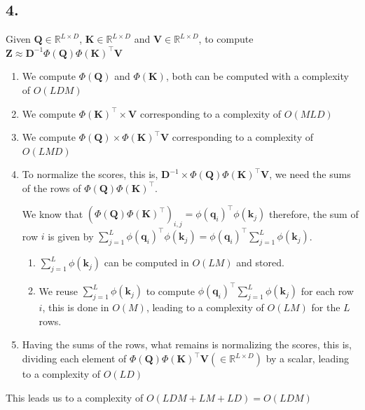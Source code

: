 \documentclass[11pt]{article}
\begin{document}
\subsection{4.}
Given $\bm{Q} \in \mathbb{R}^{L \times D}$, $\bm{K} \in \mathbb{R}^{L \times D}$ and $\bm{V} \in \mathbb{R}^{L \times D}$, to compute $\bm{Z} \approx \bm{D}^{-1} \Phi \left( \bm{Q} \right) \Phi \left( \bm{K} \right)^{\top} \bm{V}$
\begin{enumerate}
\item We compute $\Phi \left( \bm{Q} \right)$ and $\Phi \left( \bm{K} \right)$, both can be computed with a complexity of $O \left( L D M\right)$
\item We compute $\Phi \left( \bm{K} \right)^{\top} \times \bm{V}$ corresponding to a complexity of $O \left(M L D \right)$
\item We compute $\Phi \left( \bm{Q} \right) \times \Phi \left( \bm{K} \right)^{\top} \bm{V}$ corresponding to a complexity of $O \left( L M D \right)$
\item To normalize the scores, this is, $\bm{D}^{-1} \times \Phi \left( \bm{Q} \right) \Phi \left( \bm{K} \right)^{\top} \bm{V}$, we need the sums of the rows of $\Phi \left( \bm{Q} \right) \Phi \left( \bm{K} \right)^{\top}$.

  We know that $\left( \Phi \left( \bm{Q} \right) \Phi \left( \bm{K} \right)^{\top} \right)_{i, j} = \phi \left( \bm{q}_{i} \right)^{\top} \phi \left( \bm{k}_{j} \right)$ therefore, the sum of row $i$ is given by $\sum_{j = 1}^{L} \phi \left( \bm{q}_{i} \right)^{\top} \phi \left( \bm{k}_{j} \right) = \phi \left( \bm{q}_{i} \right)^{\top} \sum_{j = 1}^{L} \phi \left( \bm{k}_{j} \right)$.
  \begin{enumerate}
  \item $\sum_{j = 1}^{L} \phi \left( \bm{k}_{j} \right)$ can be computed in $O \left( L M \right)$ and stored.
  \item We reuse $\sum_{j = 1}^{L} \phi \left( \bm{k}_{j} \right)$ to compute $\phi \left( \bm{q}_{i} \right)^{\top} \sum_{j = 1}^{L} \phi \left( \bm{k}_{j} \right)$ for each row $i$, this is done in $O \left( M \right)$, leading to a complexity of $O \left( L M \right)$ for the $L$ rows.
  \end{enumerate}
\item Having the sums of the rows, what remains is normalizing the scores, this is, dividing each element of $\Phi \left( \bm{Q} \right) \Phi \left( \bm{K} \right)^{\top} \bm{V} \left( \in \mathbb{R}^{L \times D} \right)$ by a scalar, leading to a complexity of $O \left( LD \right)$
\end{enumerate}
This leads us to a complexity of $O \left( LDM + LM + LD \right) = O \left( LDM \right)$
\end{document}
